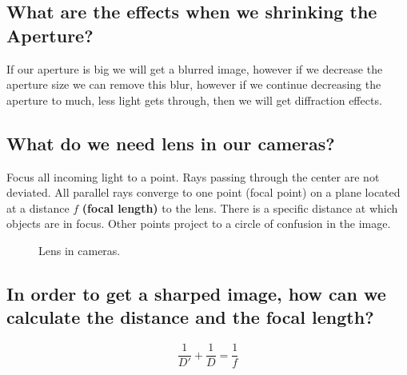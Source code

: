 \documentclass{article}
\begin{document}
\subsection{What are the effects when we shrinking the Aperture?}
If our aperture is big we will get a blurred image, however if we decrease the aperture size
we can remove this blur, however if we continue decreasing the aperture to much, less light gets
through, then we will get diffraction effects.


\subsection{What do we need lens in our cameras?}
Focus all incoming light  to a point. Rays passing through the center are not deviated. All
parallel rays converge to one point (focal point) on a plane located at a distance \(f\)
\textbf{(focal length)} to the lens. There is a specific distance at which objects are in focus.
Other points project to a circle of confusion in the image.

\begin{figure}[h!]
\centering     %
{}
\caption{Lens in cameras.}
\label{fig:lens}
\end{figure}

\subsection{In order to get a sharped image, how can we calculate the distance and the focal
length?}
\[\frac{1}{D'} + \frac{1}{D} = \frac{1}{f}\]
\end{document}
